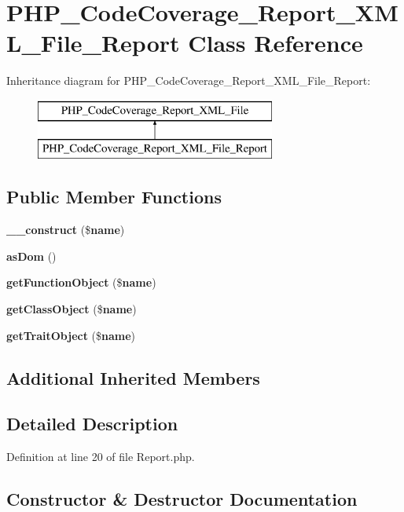 \section{P\+H\+P\+\_\+\+Code\+Coverage\+\_\+\+Report\+\_\+\+X\+M\+L\+\_\+\+File\+\_\+\+Report Class Reference}
\label{class_p_h_p___code_coverage___report___x_m_l___file___report}
Inheritance diagram for P\+H\+P\+\_\+\+Code\+Coverage\+\_\+\+Report\+\_\+\+X\+M\+L\+\_\+\+File\+\_\+\+Report\+:\begin{figure}[H]
\begin{center}
\leavevmode
\includegraphics[height=2.000000cm]{class_p_h_p___code_coverage___report___x_m_l___file___report}
\end{center}
\end{figure}
\subsection*{Public Member Functions}
\begin{DoxyCompactItemize}
\item 
{\bf \+\_\+\+\_\+construct} (\${\bf name})
\item 
{\bf as\+Dom} ()
\item 
{\bf get\+Function\+Object} (\${\bf name})
\item 
{\bf get\+Class\+Object} (\${\bf name})
\item 
{\bf get\+Trait\+Object} (\${\bf name})
\end{DoxyCompactItemize}
\subsection*{Additional Inherited Members}


\subsection{Detailed Description}


Definition at line 20 of file Report.\+php.



\subsection{Constructor \& Destructor Documentation}
